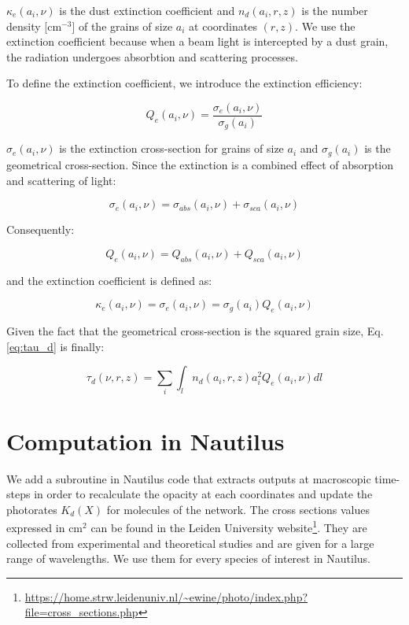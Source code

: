 \documentclass[a4paper]{article}
\begin{document}
\noindent $\kappa_e(a_i, \nu)$ is the dust extinction coefficient and $n_d(a_i, r,z)$ is the number density [$\mathrm{cm^{-3}}$] of the grains of size $a_i$ at coordinates $(r,z)$. We use the extinction coefficient because when a beam light is intercepted by a dust grain, the radiation undergoes absorbtion and scattering processes. 

\noindent To define the extinction coefficient, we introduce the extinction efficiency:

\begin{equation}
\label{eq:Qe}%
	Q_e(a_i, \nu) = \frac{\sigma_{e}(a_i, \nu)}{\sigma_{g}(a_i)}
\end{equation}

\noindent $\sigma_{e}(a_i, \nu)$ is the extinction cross-section for grains of size $a_i$ and $\sigma_{g}(a_i)$ is the geometrical cross-section. Since the extinction is a combined effect of absorption and scattering of light: 

\begin{equation}
\label{eq:sigma_e}%
	\sigma_{e}(a_i, \nu) = \sigma_{abs}(a_i, \nu) + \sigma_{sca}(a_i, \nu)
\end{equation}

\noindent Consequently:

\begin{equation}
\label{eq:q_def}%
	Q_{e}(a_i, \nu) = Q_{abs}(a_i, \nu) + Q_{sca}(a_i, \nu)
\end{equation}

\noindent and the extinction coefficient is defined as:

\begin{equation}
\label{eq:k}%
	\kappa_e(a_i, \nu) = \sigma_{e}(a_i, \nu) = \sigma_{g}(a_i) Q_e(a_i, \nu)
\end{equation}

\noindent Given the fact that the geometrical cross-section is the squared grain size, Eq. \ref{eq:tau_d} is finally:

 \begin{equation}
\label{eq:tau_d2}%
	\tau_d(\nu, r, z) =  \sum_{i} \int_l  n_d(a_i, r,z) a_i^2 Q_e(a_i, \nu)dl
\end{equation}

\section{Computation in Nautilus}%
We add a subroutine in Nautilus code that extracts outputs at macroscopic time-steps in order to recalculate the opacity at each coordinates and update the photorates $K_d(X)$ for molecules of the network.
The cross sections values expressed in $\mathrm{cm^{2}}$ can be found in the Leiden University website\footnote{\url{https://home.strw.leidenuniv.nl/~ewine/photo/index.php?file=cross_sections.php}}. They are collected from experimental and theoretical studies and are given for a large range of wavelengths. We use them for every species of interest in Nautilus.
\end{document}
